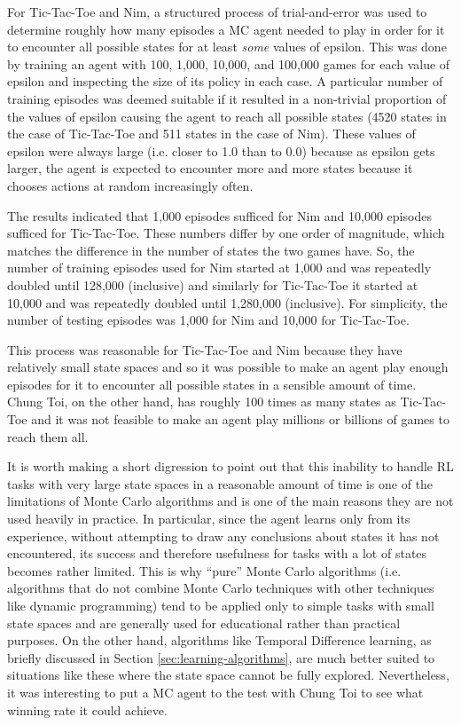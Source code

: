 \documentclass[11pt,a4paper]{report}
\begin{document}
For Tic-Tac-Toe and Nim, a structured process of trial-and-error was used to determine roughly how many episodes a MC agent needed to play in order for it to encounter all possible states for at least \emph{some} values of epsilon. This was done by training an agent with 100, 1,000, 10,000, and 100,000 games for each value of epsilon and inspecting the size of its policy in each case. A particular number of training episodes was deemed suitable if it resulted in a non-trivial proportion of the values of epsilon causing the agent to reach all possible states (4520 states in the case of Tic-Tac-Toe and 511 states in the case of Nim). These values of epsilon were always large (i.e. closer to 1.0 than to 0.0) because as epsilon gets larger, the agent is expected to encounter more and more states because it chooses actions at random increasingly often.

The results indicated that 1,000 episodes sufficed for Nim and 10,000 episodes sufficed for Tic-Tac-Toe. These numbers differ by one order of magnitude, which matches the difference in the number of states the two games have. So, the number of training episodes used for Nim started at 1,000 and was repeatedly doubled until 128,000 (inclusive) and similarly for Tic-Tac-Toe it started at 10,000 and was repeatedly doubled until 1,280,000 (inclusive). For simplicity, the number of testing episodes was 1,000 for Nim and 10,000 for Tic-Tac-Toe.

This process was reasonable for Tic-Tac-Toe and Nim because they have relatively small state spaces and so it was possible to make an agent play enough episodes for it to encounter all possible states in a sensible amount of time. Chung Toi, on the other hand, has roughly 100 times as many states as Tic-Tac-Toe and it was not feasible to make an agent play millions or billions of games to reach them all.

It is worth making a short digression to point out that this inability to handle RL tasks with very large state spaces in a reasonable amount of time is one of the limitations of Monte Carlo algorithms and is one of the main reasons they are not used heavily in practice. In particular, since the agent learns only from its experience, without attempting to draw any conclusions about states it has not encountered, its success and therefore usefulness for tasks with a lot of states becomes rather limited. This is why ``pure'' Monte Carlo algorithms (i.e. algorithms that do not combine Monte Carlo techniques with other techniques like dynamic programming) tend to be applied only to simple tasks with small state spaces and are generally used for educational rather than practical purposes. On the other hand, algorithms like Temporal Difference learning, as briefly discussed in Section \ref{sec:learning-algorithms}, are much better suited to situations like these where the state space cannot be fully explored. Nevertheless, it was interesting to put a MC agent to the test with Chung Toi to see what winning rate it could achieve.
\end{document}
